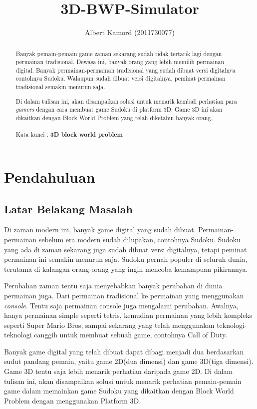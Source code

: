 \documentclass[11pt,a4paper]{report}
\author{Albert Kamord (2011730077)}
\title{3D-BWP-Simulator}
\begin{document}
\maketitle
\begin{abstract}

\indent Banyak pemain-pemain game zaman sekarang sudah tidak tertarik lagi dengan permainan tradisional. Dewasa ini, banyak orang yang lebih memilih permainan digital. Banyak permainan-permainan tradisional yang sudah dibuat versi digitalnya contohnya Sudoku. Walaupun sudah dibuat versi digitalnya, peminat permainan tradisional semakin menurun saja.

\indent Di dalam tulisan ini, akan disampaikan solusi untuk menarik kembali perhatian para \textit{gamers} dengan cara membuat game Sudoku di platform 3D. Game 3D ini akan dikaitkan dengan Block World Problem yang telah diketahui banyak orang. \\
\\
Kata kunci : \textbf{3D block world problem}
\end{abstract}

\tableofcontents \newpage 	%
\listoffigures \newpage 	%


\chapter{Pendahuluan} %
\section{Latar Belakang Masalah}
\indent Di zaman modern ini, banyak game digital yang sudah dibuat. Permainan-permainan sebelum era modern sudah dilupakan, contohnya Sudoku. Sudoku yang ada di zaman sekarang juga sudah dibuat versi digitalnya, tetapi peminat permainan ini semakin menurun saja. Sudoku pernah populer di seluruh dunia, terutama di kalangan orang-orang yang ingin mencoba kemampuan pikirannya.

\indent Perubahan zaman tentu saja menyebabkan banyak perubahan di dunia permainan juga. Dari permainan tradisional ke permainan yang menggunakan \textit{console}. Tentu saja permainan console juga mengalami perubahan. Awalnya, hanya permainan simple seperti tetris, kemudian permainan yang lebih kompleks seperti Super Mario Bros, sampai sekarang yang telah menggunakan teknologi-teknologi canggih untuk membuat sebuah game, contohnya Call of Duty.

\indent Banyak game digital yang telah dibuat dapat dibagi menjadi dua berdasarkan sudut pandang pemain, yaitu game 2D(dua dimensi) dan game 3D(tiga dimensi). Game 3D tentu saja lebih menarik perhatian daripada game 2D. Di dalam tulisan ini, akan disampaikan solusi untuk menarik perhatian pemain-pemain game dalam memainkan game Sudoku yang dikaitkan dengan Block World Problem dengan menggunakan Platform 3D.
\end{document}
